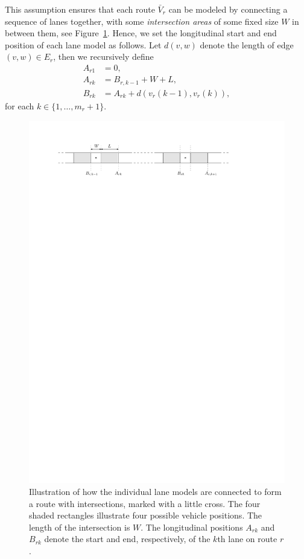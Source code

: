\documentclass[a4paper]{article}
\theoremstyle{definition}
\theoremstyle{plain}
\begin{document}
This assumption ensures that each route $\bar{V}_{r}$ can be modeled by
connecting a sequence of lanes together, with some \emph{intersection areas} of
some fixed size $W$ in between them, see Figure~\ref{fig:intersections}.
%
Hence, we set the longitudinal start and end position of each lane model as
follows. Let $d(v, w)$ denote the length of edge $(v,w) \in E_{r}$, then we
recursively define
\begin{subequations}
\begin{align}
  A_{r1} &= 0 , \\
  A_{rk} &= B_{r,k-1} + W + L , \\
  B_{rk} &= A_{rk} + d(v_{r}(k-1), v_{r}(k)) ,
\end{align}
\end{subequations}
for each $k \in \{1, \dots, m_{r} + 1\}$.


\begin{figure}
  \centering
  \includegraphics[scale=1]{figures/motion/intersection}
  \caption{Illustration of how the individual lane models are connected to form
    a route with intersections, marked with a little cross. The four shaded
    rectangles illustrate four possible vehicle positions. The length of the
    intersection is $W$. The longitudinal positions $A_{rk}$ and $B_{rk}$ denote
    the start and end, respectively, of the $k$th lane on route $r$.}%
  \label{fig:intersections}
\end{figure}
\end{document}
